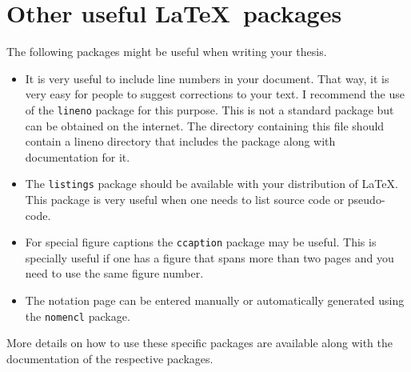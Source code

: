 \section{Other useful \LaTeX\ packages}

The following packages might be useful when writing your thesis.

\begin{itemize}  
\item It is very useful to include line numbers in your document.
  That way, it is very easy for people to suggest corrections to your
  text.  I recommend the use of the \texttt{lineno} package for this
  purpose.  This is not a standard package but can be obtained on the
  internet.  The directory containing this file should contain a
  lineno directory that includes the package along with documentation
  for it.

\item The \texttt{listings} package should be available with your
  distribution of \LaTeX.  This package is very useful when one needs
  to list source code or pseudo-code.

\item For special figure captions the \texttt{ccaption} package may be
  useful.  This is specially useful if one has a figure that spans
  more than two pages and you need to use the same figure number.

\item The notation page can be entered manually or automatically
  generated using the \texttt{nomencl} package.

\end{itemize}

More details on how to use these specific packages are available along
with the documentation of the respective packages.
